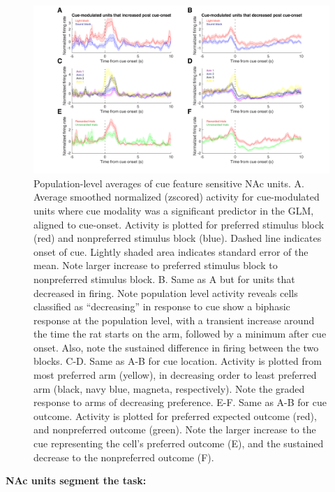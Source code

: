 \documentclass[11pt]{article}
\begin{document}
\begin{figure}[h]
\centering
\includegraphics[width=\textwidth]{Fig 7 - Population averages.png}
\caption{Population-level averages of cue feature sensitive NAc units. A. Average smoothed normalized (zscored) activity for cue-modulated units where cue modality was a significant predictor in the GLM, aligned to cue-onset. Activity is plotted for preferred stimulus block (red) and nonpreferred stimulus block (blue). Dashed line indicates onset of cue. Lightly shaded area indicates standard error of the mean. Note larger increase to preferred stimulus block to nonpreferred stimulus block. B. Same as A but for units that decreased in firing. Note population level activity reveals cells classified as “decreasing” in response to cue show a biphasic response at the population level, with a transient increase around the time the rat starts on the arm, followed by a minimum after cue onset. Also, note the sustained difference in firing between the two blocks. C-D. Same as A-B for cue location. Activity is plotted from most preferred arm (yellow), in decreasing order to least preferred arm (black, navy blue, magneta, respectively). Note the graded response to arms of decreasing preference. E-F. Same as A-B for cue outcome. Activity is plotted for preferred expected outcome (red), and nonpreferred outcome (green). Note the larger increase to the cue representing the cell’s preferred outcome (E), and the sustained decrease to the nonpreferred outcome (F).}
\label{fig:pop}
\end{figure}

{\bf NAc units segment the task:}
\end{document}
